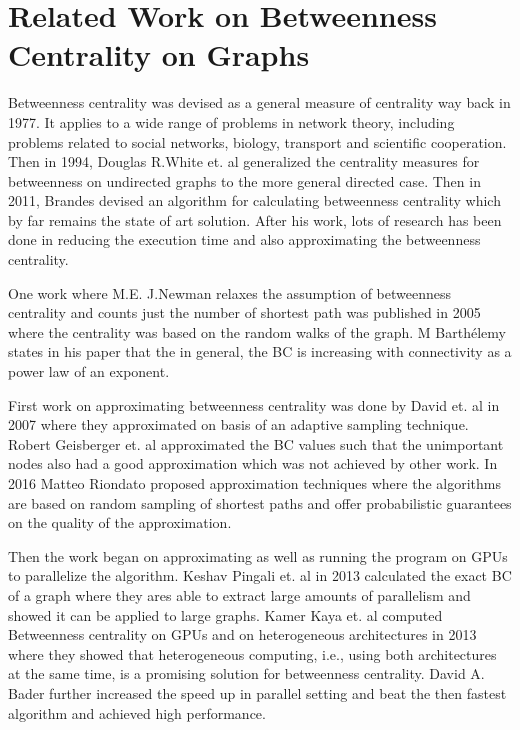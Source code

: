 \chapter{Related Work on Betweenness Centrality on Graphs}
\label{chap:relwork}

Betweenness centrality was devised as a general measure of centrality way back in 1977. It applies to a wide range of problems in network theory, including problems related to social networks, biology, transport and scientific cooperation. Then in 1994, Douglas R.White et. al generalized the centrality measures for betweenness on undirected graphs to the more general directed case. Then in 2011, Brandes devised an algorithm for calculating betweenness centrality which by far remains the state of art solution. After his work, lots of research has been done in reducing the execution time and also approximating the betweenness centrality. 

One work where M.E. J.Newman relaxes the assumption of betweenness centrality and counts just the number of shortest path was published in 2005 where the centrality was based on the random walks of the graph. M Barthélemy states in his paper that the in general, the BC is increasing with connectivity as a power law of an exponent. 

First work on approximating betweenness centrality was done by David et. al in 2007 where they approximated on basis of an adaptive sampling technique. Robert Geisberger et. al approximated the BC values such that the unimportant nodes also had a good approximation which was not achieved by other work. In 2016 Matteo Riondato proposed approximation techniques where the algorithms are based on random sampling of shortest paths and offer probabilistic guarantees on the quality of the approximation.

Then the work began on approximating as well as running the program on GPUs to parallelize the algorithm. Keshav Pingali et. al in 2013 calculated the exact BC of a graph where they ares able to extract large amounts of parallelism and showed it can be  applied to large graphs. Kamer Kaya et. al computed Betweenness centrality on GPUs and on heterogeneous architectures in 2013 where they showed that heterogeneous computing, i.e., using both architectures at the same time, is a promising solution for betweenness centrality. David A. Bader further increased the speed up in parallel setting and beat the then fastest algorithm and achieved high performance. 
